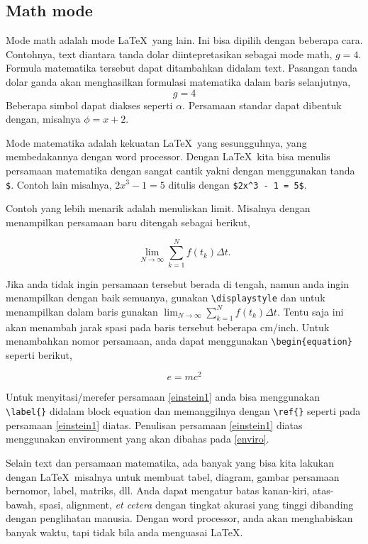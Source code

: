 \documentclass[12pt]{article}
\begin{document}
\subsection{Math mode}

Mode math adalah mode \LaTeX\ yang lain. Ini bisa dipilih dengan beberapa cara. Contohnya, text diantara tanda dolar diintepretasikan sebagai mode math, $g=4$. Formula matematika tersebut dapat ditambahkan didalam text. Pasangan tanda dolar ganda akan menghasilkan formulasi matematika dalam baris selanjutnya, $$g=4$$ Beberapa simbol dapat diakses seperti $\alpha$. Persamaan standar dapat dibentuk dengan, misalnya $\phi=x+2$.

Mode matematika adalah kekuatan \LaTeX\ yang sesungguhnya, yang membedakannya dengan word processor. Dengan \LaTeX\ kita bisa menulis persamaan matematika dengan sangat cantik yakni dengan menggunakan tanda \verb|$|.
Contoh lain misalnya, $2x^3 - 1 = 5$ ditulis dengan \verb|$2x^3 - 1 = 5$|. 

Contoh yang lebih menarik adalah menuliskan limit. Misalnya dengan menampilkan persamaan baru ditengah sebagai berikut,

$$\lim_{N \to \infty} \sum_{k=1}^N f(t_k) \Delta t.$$

Jika anda tidak ingin persamaan tersebut berada di tengah, namun anda ingin menampilkan dengan baik semuanya, gunakan  \verb|\displaystyle| dan untuk menampilkan dalam baris gunakan  $\displaystyle \lim_{N \to \infty} \sum_{k=1}^N f(t_k) \Delta t.$  Tentu saja ini akan menambah jarak spasi pada baris tersebut beberapa cm/inch. Untuk menambahkan nomor persamaan, anda dapat menggunakan \verb|\begin{equation}| seperti berikut,

\begin{equation}
    e=mc^2
\label{einstein1} 
\end{equation}

Untuk menyitasi/merefer persamaan \ref{einstein1} anda bisa menggunakan \verb|\label{}| didalam block equation dan memanggilnya dengan \verb|\ref{}| seperti pada persamaan \ref{einstein1} diatas. Penulisan persamaan \ref{einstein1} diatas menggunakan environment yang akan dibahas pada \ref{enviro}.


Selain text dan persamaan matematika, ada banyak yang bisa kita lakukan dengan \LaTeX\, misalnya untuk membuat tabel, diagram, gambar persamaan bernomor, label, matriks, dll. Anda dapat mengatur batas kanan-kiri, atas-bawah, spasi, alignment,  {\it et cetera} dengan tingkat akurasi yang tinggi dibanding dengan penglihatan manusia. Dengan word processor, anda akan menghabiskan banyak waktu, tapi tidak bila anda menguasai \LaTeX.
\end{document}
